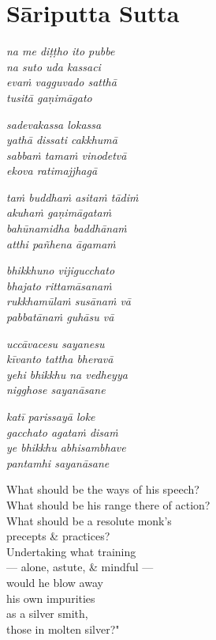 \documentclass[
  babelLanguage=english,
  final,
  webversion,
]{chantingbook}
\newcommand{\verseref}[1]{\sidepar{#1}}
\begin{document}
\chapter{Sāriputta Sutta}

\enlargethispage{\baselineskip}

\paliText

\begin{leader}
\end{leader}

\verseref{1}%
\emph{na me diṭṭho ito pubbe\\
na suto uda kassaci\\
evaṁ vagguvado satthā\\
tusitā gaṇimāgato}

\verseref{2}%
\emph{sadevakassa lokassa\\
yathā dissati cakkhumā}\\
\emph{sabbaṁ tamaṁ vinodetvā\\
ekova ratimajjhagā}

\verseref{3}%
\emph{taṁ buddhaṁ asitaṁ tādiṁ\\
akuhaṁ gaṇimāgataṁ}\\
\emph{bahūnamidha baddhānaṁ\\
atthi pañhena āgamaṁ}

\verseref{4}%
\emph{bhikkhuno vijigucchato\\
bhajato rittamāsanaṁ}\\
\emph{rukkhamūlaṁ susānaṁ vā\\
pabbatānaṁ guhāsu vā}

\verseref{5}%
\emph{uccāvacesu sayanesu\\
kīvanto tattha bheravā}\\
\emph{yehi bhikkhu na vedheyya\\
nigghose sayanāsane}

\verseref{6}%
\emph{katī parissayā loke\\
gacchato agataṁ disaṁ}\\
\emph{ye bhikkhu abhisambhave\\
pantamhi sayanāsane}

\clearpage

\englishText

What should be the ways of his speech?\\
What should be his range there of action?\\
What should be a resolute monk's\\
\vin precepts \& practices?\\
Undertaking what training\\
\vin — alone, astute, \& mindful —\\
would he blow away\\
his own impurities\\
as a silver smith,\\
\vin those in molten silver?"
\end{document}
